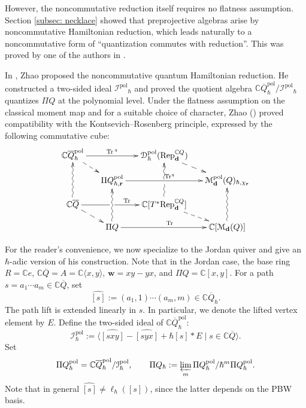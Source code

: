 \documentclass[11pt,reqno]{amsart}
\theoremstyle{definition}
\newcommand{\bbC}{\mathbb{C}}
\newcommand{\Rep}{\mathrm{Rep}}
\newcommand{\Tr}{\mathrm{Tr} \,}
\newcommand{\bd}{\mathbf{d}}
\newcommand{\mD}{\mathcal{D}}
\newcommand{\QQ}{\mathbb{C} \overline{Q}}
\newcommand{\bw}{\mathbf{w}}
\newcommand{\qneck}{{\mathbb{C} \overline{Q}}_{\hbar}}
\newcommand{\br}{\mathbf{r}}
\newcommand{\mM}{\mathcal{M}}
\newcommand{\pol}{\mathrm{pol}}
\begin{document}
However,
the noncommutative reduction itself requires no flatness assumption.
Section \ref{subsec: necklace} showed that preprojective algebras arise by noncommutative Hamiltonian reduction, which leads naturally to a noncommutative form of ``quantization commutes with reduction''. This was proved by one of the authors in \cite{Zhao2021Com,Zhao2023Non}.


In \cite{Zhao2021Com,Zhao2023Non},
Zhao proposed the noncommutative quantum Hamiltonian reduction.
He constructed a two-sided ideal \(\mathcal{I^{\pol}}_{\hbar}\)
and proved the quotient algebra \(\qneck^\pol / \mathcal{I^{\pol}}_{\hbar} \)
quantizes \(\Pi Q\) at the polynomial level.
Under the flatness assumption on the classical moment map and for a suitable choice of character,
Zhao (\cite{Zhao2021Com,Zhao2023Non}) proved compatibility with the Kontsevich--Rosenberg principle, expressed by the following commutative cube:
	\begin{equation}\label{com cubic}
		\begin{split}
			\xymatrixrowsep{0.8pc}
			\xymatrixcolsep{1.2pc}
			\xymatrix{
				\qneck^\pol \ar@{-->}[rd] \ar[rr]^-{\Tr^q}  &&
				\mD^\pol _{\hbar}(\Rep^{\bbC Q} _{\bd}) \ar@{-->}[rd] \\
				&\Pi Q^\pol _{\hbar, \br} \ar[rr]^{\mathrm{Tr}^{q}}
				&&
				\mM^\pol _{\bd}(Q)_{\hbar, \chi_{\br}} \\
				\QQ \ar@{~>}[uu] \ar@{-->}[rd] \ar'[r][rr]^-{\mathrm{Tr}}&&
				\bbC[T^\ast \Rep^{\bbC Q} _\bd] \ar@{~>}'[u][uu] \ar@{-->}[rd] \\
				& \Pi Q \ar@{~>}[uu] \ar[rr]^{\mathrm{Tr}}
				&& \mathbb{C}[\mM _{\mathbf{d}}(Q)] \ar@{~>}[uu]
			}	
		\end{split}
	\end{equation}


For the reader's convenience,
we now specialize to the Jordan quiver and give an \(\hbar\)-adic version of his construction.
Note that in the Jordan case, the base ring \(R = \bbC e\),
\(\QQ=A=\bbC\langle x,y\rangle\), \(\bw=xy-yx\), and
\(\Pi Q=\bbC[x,y]\).
For a  path
\(s=a_1\cdots a_m \in \QQ \),
set
\[
\widehat{[s]}:=(a_1,1)\cdots(a_m,m) \in \qneck.
\]
The path lift is extended linearly in \(s\).
In particular,
we denote the lifted vertex element by \(E\). 
Define the two-sided ideal of \(\qneck^\pol\):
\begin{equation}\label{eq:jordan-relations}
\mathcal{I}_\hbar^{\pol}:=\langle \widehat{[sxy]}-\widehat{[syx]}+\hbar \widehat{[s]}*E \mid s \in \QQ \rangle.
\end{equation}
Set
\[
\Pi Q^\pol _{\hbar} = \qneck^\pol / \mathcal{I}^\pol _\hbar,
\qquad
\Pi Q_\hbar : = \varprojlim_m
\Pi Q^\pol _{\hbar} / \hbar^m\Pi Q^\pol _{\hbar}.
\]
Note that in general \(\widehat{[s]}\ne\ell_\hbar([s])\),
since the latter depends on the PBW basis.
\end{document}
